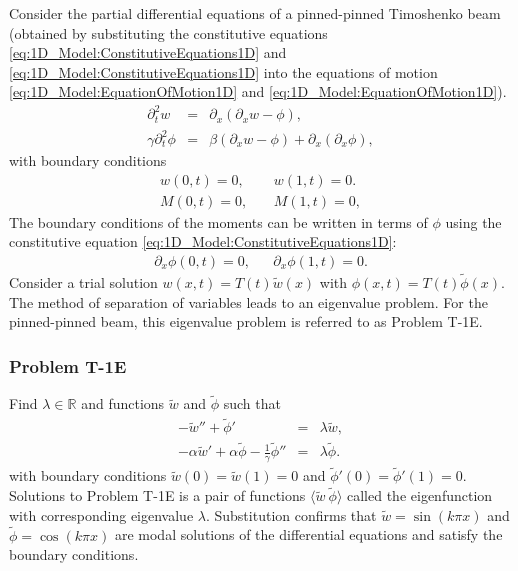\documentclass[../../main.tex]{subfiles}
\begin{document}
Consider the partial differential equations of a pinned-pinned Timoshenko beam (obtained by substituting the constitutive equations \eqref{eq:1D_Model:ConstitutiveEquations1D} and \eqref{eq:1D_Model:ConstitutiveEquations1D} into the equations of motion \eqref{eq:1D_Model:EquationOfMotion1D} and \eqref{eq:1D_Model:EquationOfMotion1D}).
\begin{eqnarray*}
	\partial^{2}_{t} w &=& \partial_{x}(\partial_{x} w - \phi), \label{eq:1D_Model:ModalPDE1}\\
	\gamma \partial^{2}_{t} \phi &=& \beta (\partial_{x} w - \phi) + \partial_{x}(\partial_{x}\phi),\label{eq:1D_Model:ModalPDE2}
\end{eqnarray*}
with boundary conditions
\begin{eqnarray*}
	w(0,t) = 0, & &	\	 w(1,t) = 0. \label{eq:1D_Model:ModalBC1}\\
	M(0,t) = 0, & &	\	M(1,t) = 0, \label{eq:1D_Model:ModalBC2}
\end{eqnarray*}
The boundary conditions of the moments can be written in terms of $\phi$ using the constitutive equation \eqref{eq:1D_Model:ConstitutiveEquations1D}:
\begin{eqnarray*}
	\partial_{x}\phi(0,t) = 0, & & \partial_{x}\phi(1,t) = 0. \label{MA_4}
\end{eqnarray*}
Consider a trial solution $w(x,t) = T(t)\tilde{w}(x)$ with $\phi(x,t) = T(t)\tilde{\phi}(x)$. \\

The method of separation of variables leads to an eigenvalue problem. For the pinned-pinned beam, this eigenvalue problem is referred to as Problem T-1E.
\subsubsection*{Problem T-1E}\label{sssec:1D_Model:Problem:T1E}
Find $\lambda \in \mathbb{R}$ and functions $\tilde{w}$ and $\tilde{\phi}$ such that
\begin{eqnarray*}
	-\tilde{w}'' + \tilde{\phi}' &=& \lambda \tilde{w}, \label{eq:1D_Model:ProblemT1E1}\\
	-\alpha \tilde{w}' + \alpha\tilde{\phi} - \frac{1}{\gamma}\tilde{\phi}'' &=& \lambda \tilde{\phi}. \label{eq:1D_Model:ProblemT1E2}
\end{eqnarray*} with boundary conditions $\tilde{w}(0) = \tilde{w}(1) = 0$ and $\tilde{\phi}'(0) = \tilde{\phi}'(1) = 0$.\\

Solutions to Problem T-1E is a pair of functions $\langle \tilde{w} \ \tilde{\phi} \rangle$ called the eigenfunction with corresponding eigenvalue $\lambda$. Substitution confirms that $\tilde{w} = \sin(k\pi x)$ and $\tilde{\phi} = \cos(k \pi x)$ are modal solutions of the differential equations and satisfy the boundary conditions.\\
\end{document}
